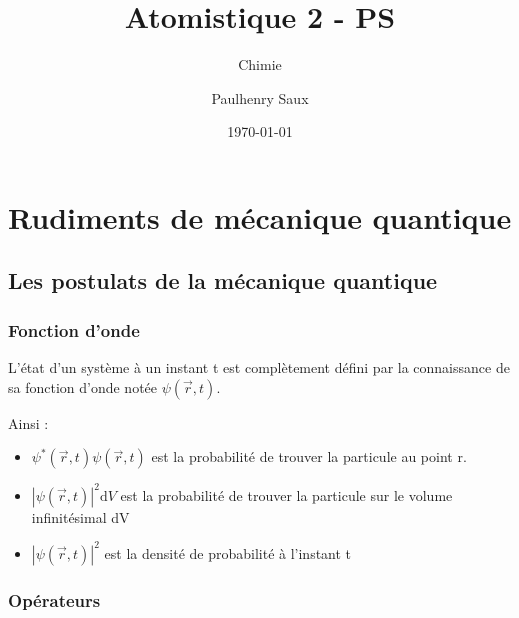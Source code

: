 \documentclass[french]{yLectureNote}
\title{Atomistique 2 - PS}
\subtitle{Chimie}
\author{Paulhenry Saux}
\date{\today}
\renewcommand{\vec}{\overrightarrow}
\newcommand{\dd}{\mathrm{d}}
\newcommand{\fo}{\psi(\vec{r},t)}
\newcommand{\foe}{\psi^*(\vec{r},t)}
\begin{document}
\chapter{Rudiments de mécanique quantique}
\section{Les postulats de la mécanique quantique}
\subsection{Fonction d'onde}
\begin{theorem}[Postulat 1]
L'état d'un système à un instant t est complètement défini par la connaissance de sa fonction d'onde notée \(\fo\).
\end{theorem}
Ainsi :
\begin{itemize}
 \item \(\foe\fo\) est la probabilité de trouver la particule au point r.
 \item \(|\fo|^2\dd V\) est la probabilité de trouver la particule sur le volume infinitésimal dV
  \item \(|\fo|^2\) est la densité de probabilité à l'instant t
\end{itemize}
\subsection{Opérateurs}
\end{document}
